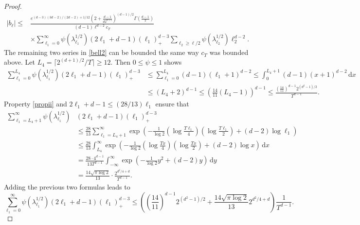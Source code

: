 \documentclass[11pt,a4paper]{article}
\theoremstyle{definition}
\begin{document}
\begin{proof}
\begin{equation}\label{bell2}
\begin{split} |b_{\ell}| \le &\frac{e^{(d-3)(3d-2)/(2d-2)+1/12} (2+\frac{d-1}{d2^{d+1}})^{(d-1)/2} \Gamma \left( \frac{d-1}{2} \right)}{(d-1)\ell^{d-2} c_T} \\ &\times \sum_{\ell_1=0}^{\infty} \psi (\lambda_{\ell_1}^{1/2}) (2\ell_1 +d-1) (\ell_1)_+^{d-3} \sum_{\ell_2 \ge \ell/2} \psi (\lambda_{\ell_2}^{1/2}) \ell_2^{d-2} . \end{split}
\end{equation}
The remaining two series in \eqref{bell2} can be bounded the same way $c_T$ was bounded above. Let $L_4=\lceil 2^{(d+1)/2}/T \rceil \ge 12$. Then $0 \le \psi \le 1$ shows
\[ \begin{split} \sum_{\ell_1=0}^{L_4} \psi (\lambda_{\ell_1}^{1/2}) (2 \ell_1+d-1) (\ell_1)_+^{d-3} &\le \sum_{\ell_1=0}^{L_4} (d-1) (\ell_1+1)^{d-2} \le \int_0^{L_4+1} (d-1) (x+1)^{d-2} \, \mathrm{d}x \\ &\le (L_4+2)^{d-1} \le \left( \frac{14}{11}(L_4-1) \right)^{d-1} \le \frac{\left( \frac{14}{11} \right)^{d-1} 2^{(d^2-1)/2}}{T^{d-1}} . \end{split} \]
Property \eqref{propii} and $2\ell_1+d-1 \le (28/13) \ell_1$ ensure that
\[ \begin{split} \sum_{\ell_1=L_4+1}^{\infty} \psi (\lambda_{\ell_1}^{1/2}) &(2 \ell_1+d-1) (\ell_1)_+^{d-3} \\ &\le \frac{28}{13} \sum_{\ell_1=L_4+1}^{\infty} \exp \left( - \frac{1}{\log 2} \left( \log \frac{T \ell_1}{4} \right) \left( \log \frac{T \ell_1}{2} \right) + (d-2) \log \ell_1 \right) \\ &\le \frac{28}{13} \int_{L_4}^{\infty} \exp \left( - \frac{1}{\log 2} \left( \log \frac{Tx}{4} \right) \left( \log \frac{Tx}{2} \right) + (d-2) \log x \right) \, \mathrm{d}x \\ &= \frac{28 \cdot 4^{d-1}}{13 T^{d-1}} \int_{-\infty}^{\infty} \exp \left( - \frac{1}{\log 2} y^2 + (d-2) y \right) \, \mathrm{d}y \\ &= \frac{14\sqrt{\pi \log 2}}{13} \cdot \frac{2^{d^2/4+d}}{T^{d-1}} . \end{split} \]
Adding the previous two formulas leads to
\begin{equation}\label{ell1sum}
\sum_{\ell_1=0}^{\infty} \psi (\lambda_{\ell_1}^{1/2}) (2 \ell_1+d-1) (\ell_1)_+^{d-3} \le \left( \left( \frac{14}{11} \right)^{d-1} 2^{(d^2-1)/2} + \frac{14 \sqrt{\pi \log 2}}{13}2^{d^2/4+d} \right) \frac{1}{T^{d-1}}.
\end{equation}

\end{proof}
\end{document}
